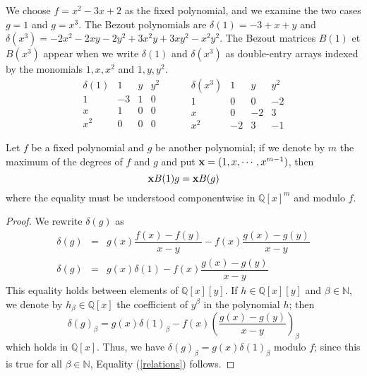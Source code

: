 \documentclass{standalone}
\begin{document}
\begin{exmp}
\label{exmp_1}
We choose $f = x^2 - 3x + 2$ as the fixed polynomial, and we examine the two cases $g=1$ and $g = x^3$. 
The Bezout polynomials are $\delta(1) = -3 + x + y$ and $\delta(x^3) = -2x^2 - 2xy -2y^2 + 3x^2y + 3xy^2 -x^2y^2$. 
The Bezout matrices $B(1)$ et $B(x^3)$ appear when we write  $\delta(1)$ and  $\delta(x^3)$ as double-entry arrays indexed by the monomials $1, x, x^2$ and $1, y, y^2$.
$$
\begin{array}{c|ccc}
\delta(1) & 1 & y & y^2\\
\hline
1 & -3 & 1 & 0\\
x & 1 & 0 & 0\\
x^2 & 0 & 0 & 0
\end{array}
\hspace{1cm}
\begin{array}{c|ccc}
\delta(x^3) & 1 & y & y^2\\
\hline
1 & 0 & 0 & -2\\
x & 0 & -2 & 3\\
x^2 & -2 & 3 & -1
\end{array}
$$
\end{exmp}

\begin{prop}
\label{relations_prop}
Let $f$ be a fixed polynomial and $g$ be another polynomial; if we denote by $m$ the maximum of the degrees of $f$ and $g$ and put $\bold{x} = (1, x,\cdots, x^{m-1})$, then
\begin{equation}
\label{relations}
	\bold{x}B(1)g = \bold{x}B(g)
\end{equation}
where the equality must be understood componentwise in $\mathbb{Q}[x]^m$ and modulo $f$.
\end{prop}
\begin{proof}
We rewrite $\delta(g)$ as
\begin{align*}
	\delta(g) & = & g(x)\dfrac{f(x)-f(y)}{x-y} - f(x)\dfrac{g(x)-g(y)}{x-y} \\ \nonumber
	\delta(g) & = & g(x)\delta(1) - f(x)\dfrac{g(x)-g(y)}{x-y}
\end{align*}
This equality holds between elements of $\mathbb{Q}[x][y]$. 
If $h\in \mathbb{Q}[x][y]$ and $\beta\in\mathbb{N}$, we denote by $h_\beta \in \mathbb{Q}[x]$ the coefficient of $y^\beta$ in the polynomial $h$; then
$$\delta(g)_\beta = g(x)\delta(1)_\beta - f(x)\left(\dfrac{g(x)-g(y)}{x-y}\right)_\beta$$
which holds in $\mathbb{Q}[x]$. Thus, we have $\delta(g)_\beta = g(x)\delta(1)_\beta$ modulo $f$; since this is true for all $\beta\in\mathbb{N}$, Equality (\ref{relations}) follows.
\end{proof}
\end{document}
